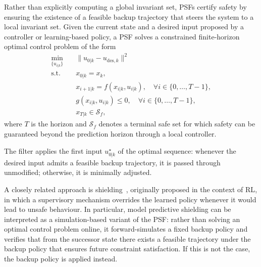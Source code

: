  Rather than explicitly computing a global invariant set, PSFs certify safety by ensuring the existence of a feasible backup trajectory that steers the system to a local invariant set.
Given the current state and a desired input proposed by a controller or learning-based policy, a \ac{PSF} solves a constrained finite-horizon optimal control problem of the form
\[
	\begin{aligned}
		\min_{\{u_{i|k}\}}
		\quad              &
		\|u_{0|k}-u_{\mathrm{des},k}\|^2                                     \\
		\mathrm{s.t.}\quad &
		x_{0|k}=x_k,                                                         \\
		                   &
		x_{i+1|k}=f(x_{i|k},u_{i|k}),  \quad \forall i \in \{0,\ldots,T-1\}, \\
		                   &
		g(x_{i|k},u_{i|k}) \leq 0, \quad \forall i \in \{0,\ldots,T-1\},     \\
		                   & x_{T|k}\in\mathcal S_f ,
	\end{aligned}
\]
where $T$ is the horizon and $\mathcal S_f$ denotes a terminal safe set for which safety can be guaranteed beyond the prediction horizon through a local controller. 

The filter applies the first input $u_{0|k}^\star$ of the optimal sequence: whenever the desired input admits a feasible backup trajectory, it is passed through unmodified; otherwise, it is minimally adjusted.  

A closely related approach is shielding~\cite{alshiekh2018safe, bastani2021safe}, originally proposed in the context of \ac{RL}, in which a supervisory mechanism overrides the learned policy whenever it would lead to unsafe behaviour. In particular, model predictive shielding can be interpreted as a simulation-based variant of the \ac{PSF}: rather than solving an optimal control problem online, it forward-simulates a fixed backup policy and verifies that from the successor state there exists a feasible trajectory under the backup policy that ensures future constraint satisfaction. If this is not the case, the backup policy is applied instead.

